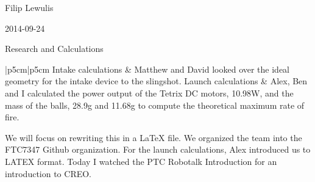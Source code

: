 Filip Lewulis

2014-09-24

Research and Calculations

\begin{tabular}{|p{5cm}|p{5cm}}
  \hline
Intake calculations
  &
Matthew and David looked over the ideal geometry for the intake device to the slingshot.
\hline
Launch calculations
  &
Alex, Ben and I calculated the power output of the Tetrix DC motors, 10.98W,
and the mass of the balls, 28.9g and 11.68g to compute the theoretical maximum rate of fire.
  \hline
\end{tabular}
We will focus on rewriting this in a LaTeX file.
We organized the team into the FTC7347 Github organization. For the launch calculations,
Alex introduced us to LATEX format. Today I watched the PTC Robotalk Introduction for
an introduction to CREO.
